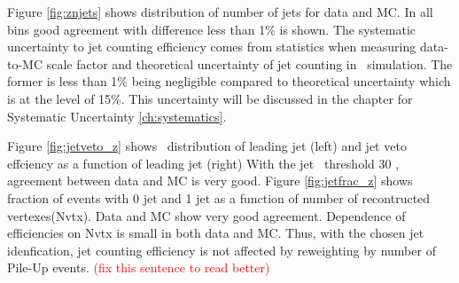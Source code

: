 Figure \ref{fig:znjets} shows distribution of number of jets for data and MC. 
In all bins good agreement with difference less than 1\% is shown. 
The systematic uncertainty to jet counting efficiency comes from statistics 
when measuring data-to-MC scale factor and theoretical uncertainty of jet 
counting in \hww~simulation. The former is less than 1\% being negligible 
compared to theoretical uncertainty which is at the level of 15\%. 
This uncertainty will be discussed in the chapter for Systematic Uncertainty \ref{ch:systematics}. 

Figure \ref{fig:jetveto_z} shows \pt~distribution of leading jet (left) 
and jet veto effciency as a function of leading jet \pt(right)
With the jet \pt~threshold 30 \GeV, agreement between data and MC is very good. 
Figure \ref{fig:jetfrac_z} shows fraction of events with 0 jet and 
1 jet as a function of number of recontructed vertexes(Nvtx). 
Data and MC show very good agreement.
Dependence of efficiencies on Nvtx is small in both data and MC.
Thus, with the chosen jet idenfication, jet counting efficiency 
is not affected by reweighting by number of Pile-Up events. 
\textcolor{red}{(fix this sentence to read better)} 


